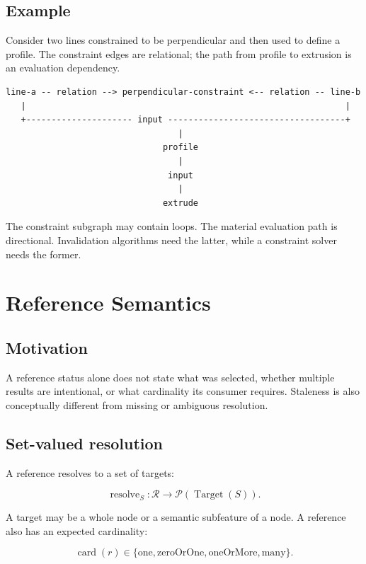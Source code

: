 \documentclass[11pt]{article}
\begin{document}
\subsection{Example}

Consider two lines constrained to be perpendicular and then used to define a
profile. The constraint edges are relational; the path from profile to
extrusion is an evaluation dependency.

\begin{verbatim}
line-a -- relation --> perpendicular-constraint <-- relation -- line-b
   |                                                               |
   +--------------------- input -----------------------------------+
                                  |
                               profile
                                  |
                                input
                                  |
                               extrude
\end{verbatim}

The constraint subgraph may contain loops. The material evaluation path is
directional. Invalidation algorithms need the latter, while a constraint solver
needs the former.

\section{Reference Semantics}

\subsection{Motivation}

A reference status alone does not state what was selected, whether multiple
results are intentional, or what cardinality its consumer requires. Staleness
is also conceptually different from missing or ambiguous resolution.

\subsection{Set-valued resolution}

A reference resolves to a set of targets:

\[
\operatorname{resolve}_S:
\mathcal{R}\rightarrow\mathcal{P}(\operatorname{Target}(S)).
\]

A target may be a whole node or a semantic subfeature of a node. A reference
also has an expected cardinality:

\[
\operatorname{card}(r)\in
\{\mathrm{one},\mathrm{zeroOrOne},\mathrm{oneOrMore},\mathrm{many}\}.
\]
\end{document}
